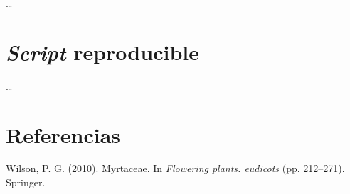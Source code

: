 \documentclass[11pt,]{article}
\begin{document}
\ldots

\section{\texorpdfstring{\emph{Script}
reproducible}{Script reproducible}}\label{script-reproducible}

\ldots

\section*{Referencias}\label{referencias}

\hypertarget{refs}{}
\hypertarget{ref-wilson2010myrtaceae}{}
Wilson, P. G. (2010). Myrtaceae. In \emph{Flowering plants. eudicots}
(pp. 212--271). Springer.




\newpage
\singlespacing 
\end{document}
